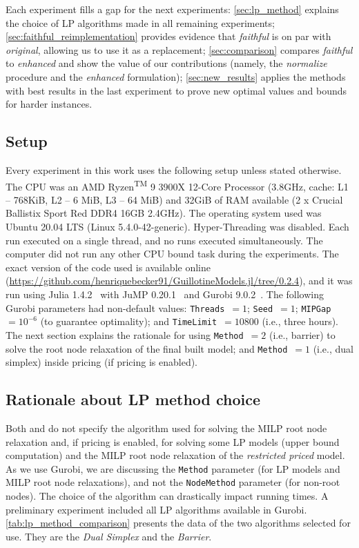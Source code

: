 \documentclass[smallextended]{svjour3}       %
\begin{document}
Each experiment fills a gap for the next experiments:
\autoref{sec:lp_method} explains the choice of LP algorithms made in all remaining experiments;
\autoref{sec:faithful_reimplementation} provides evidence that \emph{faithful} is on par with \emph{original}, allowing us to use it as a replacement;
\autoref{sec:comparison} compares \emph{faithful} to \emph{enhanced} and show the value of our contributions (namely, the \emph{normalize} procedure and the \emph{enhanced} formulation);
\autoref{sec:new_results} applies the methods with best results in the last experiment to prove new optimal values and bounds for harder instances.

\subsection{Setup}
\label{sec:setup}

Every experiment in this work uses the following setup unless stated otherwise.
The CPU was an AMD\textsuperscript{\textregistered} Ryzen\textsuperscript{TM} 9 3900X 12-Core Processor (3.8GHz, cache: L1 -- 768KiB, L2 -- 6 MiB, L3 -- 64 MiB) and 32GiB of RAM available (2 x Crucial Ballistix Sport Red DDR4 16GB 2.4GHz).
The operating system used was Ubuntu 20.04 LTS (Linux 5.4.0-42-generic).
Hyper-Threading was disabled.
Each run executed on a single thread, and no runs executed simultaneously.
The computer did not run any other CPU bound task during the experiments.
The exact version of the code used is available online (\url{https://github.com/henriquebecker91/GuillotineModels.jl/tree/0.2.4}), and it was run using Julia 1.4.2~\cite{julia} with JuMP 0.20.1~\cite{JuMP} and Gurobi 9.0.2~\cite{gurobi}.
The following Gurobi parameters had non-default values: \verb+Threads+~\(= 1\); \verb+Seed+~\(= 1\); \verb+MIPGap+~\(= 10^{-6}\) (to guarantee optimality); and \verb+TimeLimit+~\(= 10800\) (i.e., three hours).
The next section explains the rationale for using \verb+Method+~\(= 2\) (i.e., barrier) to solve the root node relaxation of the final built model; and \verb+Method+~\(= 1\) (i.e., dual simplex) inside pricing (if pricing is enabled).

\subsection{Rationale about LP method choice}
\label{sec:lp_method}

Both \cite{furini:2016} and \cite{dimitri_thesis} do not specify the algorithm used for solving the MILP root node relaxation and, if pricing is enabled, for solving some LP models (upper bound computation) and the MILP root node relaxation of the \emph{restricted priced} model.
As we use Gurobi, we are discussing the \verb+Method+ parameter (for LP models and MILP root node relaxations), and not the \verb+NodeMethod+ parameter (for non-root nodes).
The choice of the algorithm can drastically impact running times.
A preliminary experiment included all LP algorithms available in Gurobi.
\autoref{tab:lp_method_comparison} presents the data of the two algorithms selected for use.
They are the \emph{Dual Simplex} and the \emph{Barrier}.
\end{document}
